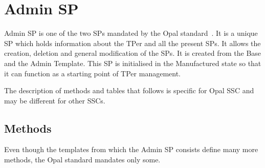 

\section{Admin SP}
\label{admin_sp}


Admin SP is one of the two SPs mandated by the Opal standard~\cite{tcg-opal2}. It is a unique SP which holds information about the TPer and all the present SPs. It allows the creation, deletion and general modification of the SPs.
It is created from the Base and the Admin Template.
This SP is initialised in the Manufactured state so that it can function as a starting point of TPer management. 

The description of methods and tables that follows is specific for Opal SSC and may be different for other SSCs. 





\subsection{Methods}

Even though the templates from which the Admin SP consists define many more methods, the Opal standard mandates only some.

